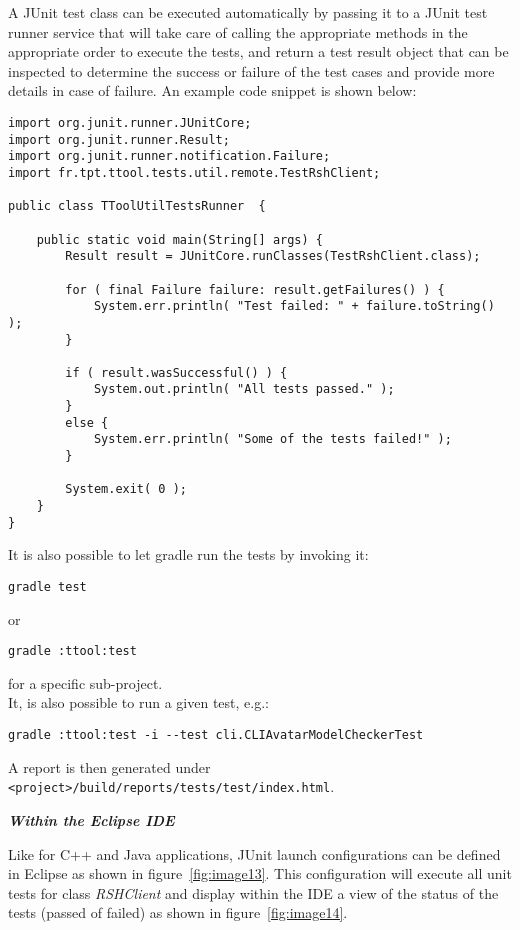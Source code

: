 \documentclass[12pt]{article}
\begin{document}
A JUnit test class can be executed automatically by passing
it to a JUnit test runner service that will take care of calling the appropriate
methods in the appropriate order to execute the tests, and return a test result
object that can be inspected to determine the success or failure of the test
cases and provide more details in case of failure. An example code snippet is
shown below:

\begin{verbatim}
import org.junit.runner.JUnitCore;
import org.junit.runner.Result;
import org.junit.runner.notification.Failure;
import fr.tpt.ttool.tests.util.remote.TestRshClient;

public class TToolUtilTestsRunner  {

    public static void main(String[] args) {
        Result result = JUnitCore.runClasses(TestRshClient.class);

        for ( final Failure failure: result.getFailures() ) { 
            System.err.println( "Test failed: " + failure.toString() );
        }
 		
        if ( result.wasSuccessful() ) {
            System.out.println( "All tests passed." );
        }
        else {
            System.err.println( "Some of the tests failed!" );
        }
 
        System.exit( 0 );
    }
}
\end{verbatim}

It is also possible to let gradle run the tests by invoking it:
\begin{verbatim}
gradle test
\end{verbatim}
or
\begin{verbatim}
gradle :ttool:test
\end{verbatim}
for a specific sub-project.\\

It, is also possible to run a given test, e.g.:
\begin{verbatim}
gradle :ttool:test -i --test cli.CLIAvatarModelCheckerTest
\end{verbatim}

A report is then generated under
\texttt{<project>/build/reports/tests/test/index.html}.

\textbf{\emph{Within the Eclipse IDE}}

Like for C++ and Java applications, JUnit launch configurations can be defined
in Eclipse as shown in figure~\ref{fig:image13}. This configuration will execute all unit tests
for class \textit{RSHClient} and display within the IDE a view of the status of
the tests (passed of failed) as shown in figure~\ref{fig:image14}.
\end{document}
